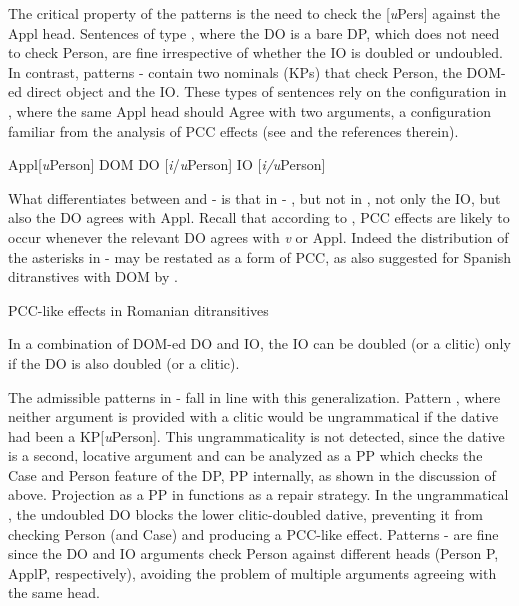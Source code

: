 \documentclass[output=paper,colorlinks,citecolor=brown,nonflat]{langsci/langscibook}
\begin{document}
The critical property of the patterns is the need to check the [\textit{u}Pers] against the Appl head. Sentences of type , where the DO is a bare DP, which does not need to check Person, are fine irrespective of whether the IO is doubled or undoubled. In contrast, patterns - contain two nominals (KPs) that check Person, the DOM-ed direct object and the IO. These types of sentences rely on the configuration in , where the same Appl head should Agree with two arguments, a configuration familiar from the analysis of PCC effects (see  and the references therein).

\ea%
   \label{ex:cornilescu:36}
   Appl[\textit{u}Person] \hspace{0.8cm} DOM DO [\textit{i}/\textit{u}Person] \hspace{0.8cm} IO [\textit{i/u}Person]
   \z


\newpage
What differentiates between  and - is that in - , but not in , not only the IO, but also the DO agrees with Appl. Recall that according to \citet{Preminger2019}, PCC effects are likely to occur whenever the relevant DO agrees with \textit{v} or Appl. Indeed the distribution of the asterisks in -  may be restated as a form of PCC, as also suggested for Spanish ditranstives with DOM by \citet{OrmazabalRomero2013Borealis}.

\ea%
   \label{ex:cornilescu:37}
   PCC-like effects in Romanian ditransitives

In a combination of DOM-ed DO and IO, the IO can be doubled (or a clitic) only if the DO is also doubled (or a clitic).
   \z

The admissible patterns in - fall in line with this generalization. Pattern , where neither argument is provided with a clitic would be ungrammatical if the dative had been a KP[\textit{u}Person]. This ungrammaticality is not detected, since the dative is a second, locative argument and can be analyzed as a PP which checks the Case and Person feature of the DP, PP internally, as shown in the discussion of  above. Projection as a PP in  functions as a repair strategy. In the ungrammatical , the undoubled DO blocks the lower clitic-doubled dative, preventing it from checking Person (and Case) and producing a PCC-like effect. Patterns - are fine since the DO and IO arguments check Person against different heads (Person P, ApplP, respectively), avoiding the problem of multiple arguments agreeing with the same head.
\end{document}
